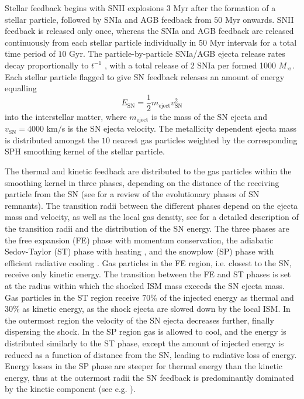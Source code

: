 \documentclass[a4paper,fleqn,usenatbib]{mnras}
\begin{document}
Stellar feedback begins with SNII explosions $3$ Myr after the formation of a stellar particle,
followed by SNIa and AGB feedback from $50$ Myr onwards. 
SNII feedback is released only once, whereas the SNIa and AGB feedback are 
released continuously from each stellar particle individually in $50$ Myr intervals for a total time period of $10$ Gyr.
The particle-by-particle SNIa/AGB ejecta release rates decay proportionally to 
$t^{-1}$ \citep{2011MNRAS.412.1508M}, with a total release 
of 2 SNIa per formed 1000 $M_{\sun}$. Each stellar particle flagged to give SN feedback releases an amount of energy equalling
\begin{equation}
 E_\mathrm{SN}=\frac{1}{2}m_\mathrm{eject} v_\mathrm{SN}^2
\end{equation}
into the interstellar matter, where $m_\mathrm{eject}$ is the mass of the SN ejecta and 
$v_\mathrm{SN}=4000$ km$/$s is the SN ejecta velocity. 
The metallicity dependent ejecta mass is distributed amongst the $10$
nearest gas particles weighted by the corresponding SPH smoothing kernel
of the stellar particle. 

The thermal and kinetic feedback are distributed to the gas particles within the smoothing kernel
in three phases, depending on the distance of the receiving particle 
from the SN (see \citealt{1988ApJ...334..252C} for a review of the evolutionary 
phases of SN remnants). 
The transition radii between the different phases depend on the ejecta mass and 
velocity, as well as the local gas density, see \citet{2017ApJ...836..204N} for a detailed 
description of the transition radii and the distribution of the SN energy.
The three phases are the free expansion (FE) phase with momentum conservation, the adiabatic Sedov-Taylor (ST) phase with 
heating \citep{1950RSPSA.201..159T, 1959sdmm.book.....S}, 
and the snowplow (SP) phase with efficient radiative cooling 
\citep{1977ApJ...218..148M, 1998ApJ...500..342B}. Gas 
particles in the FE region, i.e. closest to the SN, receive only kinetic 
energy. The transition between the FE and ST phases is set at the radius  
within which the shocked ISM mass exceeds the SN ejecta mass.
Gas particles in the ST region receive $70\%$ of the injected energy as 
thermal and $30\%$ as kinetic energy, as the shock ejecta are slowed down by the 
local ISM. In the outermost region the velocity of the SN ejecta decreases 
further, finally dispersing the shock. In the SP region gas is allowed to cool, 
and the energy is distributed similarly to the ST phase, except the amount of 
injected energy is reduced as a function of distance from the SN, leading to 
radiative loss of energy. Energy losses in the SP phase are steeper for thermal
energy than the kinetic energy, thus at the outermost radii the SN feedback 
is predominantly dominated by the kinetic component (see e.g. \citealt{2017ApJ...836..204N}).
\end{document}
